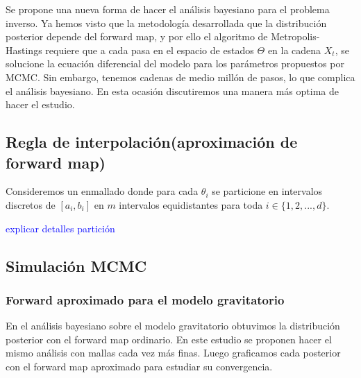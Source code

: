 Se propone una nueva forma de hacer el análisis bayesiano para el problema inverso. Ya hemos visto que la metodología desarrollada que la distribución posterior depende del forward map, y por ello el algoritmo de Metropolis-Hastings requiere que a cada pasa en el espacio de estados $\Theta$ en la cadena $X_t$, se solucione la ecuación diferencial del modelo para los parámetros propuestos por MCMC. Sin embargo, tenemos cadenas de medio millón de pasos, lo que complica el análisis bayesiano. En esta ocasión discutiremos una manera más optima de hacer el estudio.

\subsection{Regla de interpolación(aproximación de forward map)}

Consideremos un enmallado donde para cada $\theta_i$ se particione en intervalos discretos de $[a_i,b_i]$ en $m$ intervalos equidistantes para toda $i \in \{1,2,...,d\}.$ 

\textcolor{blue}{explicar detalles partición}



\subsection{Simulación MCMC}
\subsubsection{Forward aproximado para el modelo gravitatorio}

En el análisis bayesiano sobre el modelo gravitatorio obtuvimos la distribución posterior con el forward map ordinario. En este estudio se proponen hacer el mismo análisis con mallas cada vez más finas. Luego graficamos cada posterior con el forward map aproximado para estudiar su convergencia.



